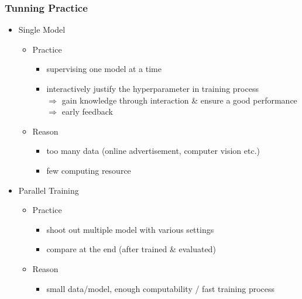 \subsubsection{Tunning Practice}
\begin{itemize}
\item Single Model
	\begin{itemize}
	\item Practice
		\begin{itemize}
		\item supervising one model at a time
		\item interactively justify the hyperparameter in training process  \\
		$\Rightarrow$ gain knowledge through interaction \& ensure a good performance \\
		$\Rightarrow$ early feedback
		\end{itemize}
	\item Reason
		\begin{itemize}
		\item too many data (online advertisement, computer vision etc.)
		\item few computing resource
		\end{itemize}
	\end{itemize}
\item Parallel Training
	\begin{itemize}
	\item Practice
		\begin{itemize}
		\item shoot out multiple model with various settings
		\item compare at the end (after trained \& evaluated)
		\end{itemize}
	\item Reason
		\begin{itemize}
		\item small data/model, enough computability / fast training process
		\end{itemize}
	\end{itemize}
\end{itemize}
